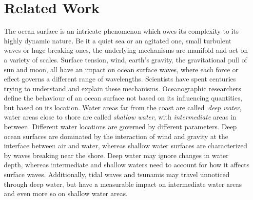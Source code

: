 \chapter{Related Work}
\label{ch:state_of_the_art}
%
The ocean surface is an intricate phenomenon which owes its complexity
to its highly dynamic nature. Be it a quiet sea or an agitated one, small
turbulent waves or huge breaking ones, the underlying mechanisms are manifold
and act on a variety of scales. 
Surface tension, wind, earth's gravity, the gravitational pull of
sun and moon, all have an impact on ocean surface waves, where each force or
effect governs a different range of wavelengths.
Scientists have spent centuries trying to understand and explain these mechanisms.
%
Oceanographic researchers define the behaviour of an ocean surface not based
on its influencing quantities, but based on its location. Water areas far from the
coast are called~\emph{deep water}, water areas close to shore are called
\emph{shallow water}, with \emph{intermediate} areas in between. Different
water locations are governed by different parameters. Deep ocean surfaces are
dominated by the interaction of wind and gravity at the interface
between air and water, whereas shallow water surfaces are characterized by waves
breaking near the shore. Deep water may ignore changes in water depth,
whereas intermediate and shallow waters need to account for how it affects
surface waves. Additionally, tidal waves and tsunamis may travel unnoticed
through deep water, but have a measurable impact on intermediate water areas
and even more so on shallow water areas.
% 
%

